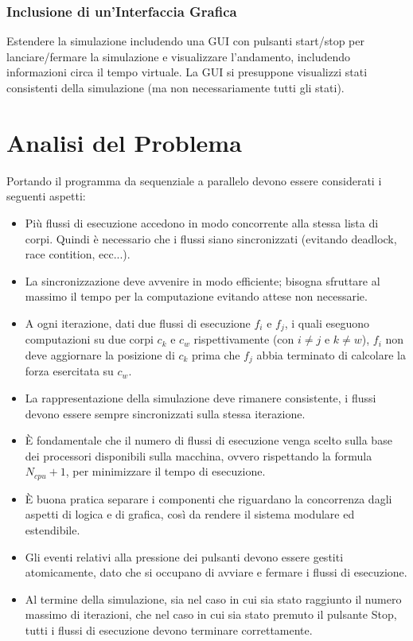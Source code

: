 \documentclass[12pt,a4paper,openright,twoside]{book}
\begin{document}
\subsection{Inclusione di un'Interfaccia Grafica}
Estendere la simulazione includendo una GUI con pulsanti start/stop per lanciare/fermare la simulazione e visualizzare l'andamento,
includendo informazioni circa il tempo virtuale.
La GUI si presuppone visualizzi stati consistenti della simulazione (ma non necessariamente tutti gli stati).
\chapter{Analisi del Problema}
\label{chap:Analisi del Problema}
Portando il programma da sequenziale a parallelo devono essere considerati i seguenti aspetti:
\begin{itemize}
	\item Più flussi di esecuzione accedono in modo concorrente alla stessa lista di corpi.
	Quindi è necessario che i flussi siano sincronizzati (evitando deadlock, race contition, ecc...).
	\item La sincronizzazione deve avvenire in modo efficiente; bisogna sfruttare al massimo il tempo per
	la computazione evitando attese non necessarie.
	\item A ogni iterazione, dati due flussi di esecuzione $f_{i}$ e $f_{j}$, i quali eseguono computazioni su due corpi $c_{k}$ e $c_{w}$ rispettivamente (con $i \neq j$ e $k \neq w$),
	$f_{i}$ non deve aggiornare la posizione di $c_{k}$ prima che $f_{j}$ abbia terminato di calcolare la forza esercitata su $c_{w}$.
	\item La rappresentazione della simulazione deve rimanere
	consistente, i flussi devono essere sempre sincronizzati sulla
	stessa iterazione.
	\item È fondamentale che il numero di flussi di esecuzione venga scelto sulla base dei processori disponibili sulla macchina, ovvero
	rispettando la formula $N_{cpu} + 1$, per minimizzare il tempo di esecuzione.
	\item È buona pratica separare i componenti che riguardano la concorrenza dagli aspetti di logica e di grafica,
	così da rendere il sistema modulare ed estendibile.
	\item Gli eventi relativi alla pressione dei pulsanti
	devono essere gestiti atomicamente, dato che si occupano di
	avviare e fermare i flussi di esecuzione.
	\item Al termine della simulazione, sia nel caso in cui sia stato raggiunto
	il numero massimo di iterazioni, che nel caso in cui sia stato premuto il
	pulsante Stop, tutti i flussi di esecuzione devono terminare correttamente.
\end{itemize}
\end{document}
